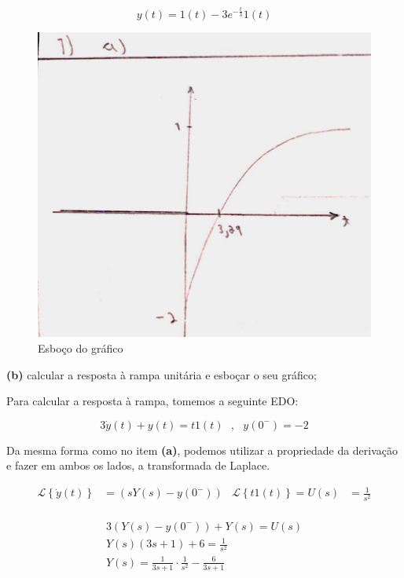 \documentclass{article}
\begin{document}
\[y(t) = 1(t) - 3e^{-\frac{t}{3}}1(t)\]

\begin{figure}[h]
    \includegraphics[scale=0.21]{Q1_a.png}
    \centering
    \caption{Esboço do gráfico}
\end{figure}

\textbf{(b)} calcular a resposta à rampa unitária e esboçar o seu gráfico;

Para calcular a resposta à rampa, tomemos a seguinte EDO:

\[3\dot{y}(t) + y(t) = t1(t) \,\,\,\,,\,\,\,\,y(0^-) = -2\]

Da mesma forma como no item \textbf{(a)}, podemos utilizar a propriedade da derivação e fazer em ambos os lados, a transformada de Laplace.

\begin{align*}
    \mathcal{L}\left\{\dot{y}(t)\right\} &= \left(sY(s) - y(0^-)\right) & \mathcal{L}\left\{t1(t)\right\} = U(s) &= \frac{1}{s^2}\\
\end{align*}

\begin{align*}
    3(Y(s) - y(0^-)) + Y(s) = U(s)\\
    Y(s)(3s + 1) + 6 = \frac{1}{s^2}\\
    Y(s) = \frac{1}{3s + 1}\cdot\frac{1}{s^2} - \frac{6}{3s + 1}
\end{align*}
\end{document}
